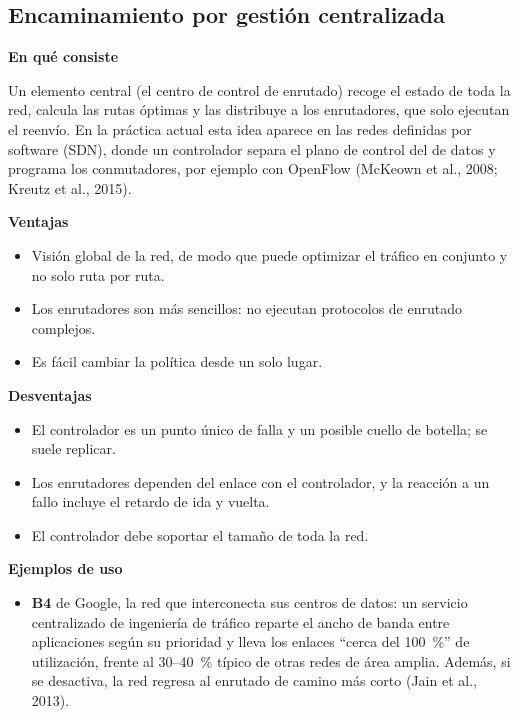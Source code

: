 \documentclass[12pt,letterpaper]{article}
\newcommand{\rub}[1]{\par\medskip\noindent\textbf{#1}\par\nopagebreak}
\begin{document}
\subsection{Encaminamiento por gestión centralizada}
\rub{En qué consiste}
Un elemento central (el centro de control de enrutado) recoge el estado de toda la red, calcula las rutas óptimas y las distribuye a los enrutadores, que solo ejecutan el reenvío. En la práctica actual esta idea aparece en las redes definidas por software (SDN), donde un controlador separa el plano de control del de datos y programa los conmutadores, por ejemplo con OpenFlow (McKeown et al., 2008; Kreutz et al., 2015).
\rub{Ventajas}
\begin{itemize}[itemsep=2pt]
\item Visión global de la red, de modo que puede optimizar el tráfico en conjunto y no solo ruta por ruta.
\item Los enrutadores son más sencillos: no ejecutan protocolos de enrutado complejos.
\item Es fácil cambiar la política desde un solo lugar.
\end{itemize}
\rub{Desventajas}
\begin{itemize}[itemsep=2pt]
\item El controlador es un punto único de falla y un posible cuello de botella; se suele replicar.
\item Los enrutadores dependen del enlace con el controlador, y la reacción a un fallo incluye el retardo de ida y vuelta.
\item El controlador debe soportar el tamaño de toda la red.
\end{itemize}
\rub{Ejemplos de uso}
\begin{itemize}[itemsep=2pt]
\item \textbf{B4} de Google, la red que interconecta sus centros de datos: un servicio centralizado de ingeniería de tráfico reparte el ancho de banda entre aplicaciones según su prioridad y lleva los enlaces ``cerca del 100~\%'' de utilización, frente al 30--40~\% típico de otras redes de área amplia. Además, si se desactiva, la red regresa al enrutado de camino más corto (Jain et al., 2013).
\end{itemize}
\end{document}
